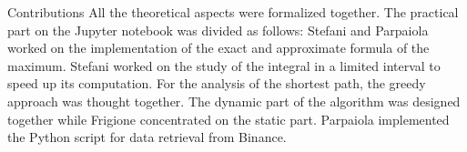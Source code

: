 \begin{projsection}{Contributions}
	All the theoretical aspects were formalized together. The practical part on the Jupyter notebook was divided as follows: Stefani and Parpaiola worked on the implementation of the exact and approximate formula of the maximum. Stefani worked on the study of the integral in a limited interval to speed up its computation. For the analysis of the shortest path, the greedy approach was thought together. The dynamic part of the algorithm was designed together while Frigione concentrated on the static part. Parpaiola implemented the Python script for data retrieval from Binance.
\end{projsection}


	
	
	
	
	
	
	
